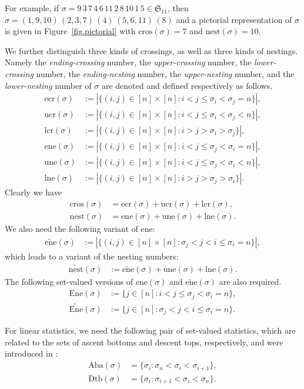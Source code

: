 \documentclass[12pt,reqno]{amsart}
\numberwithin{equation}{section}
\theoremstyle{plain}
\theoremstyle{definition}
\def\Sym{\mathfrak{S}}
\def\nest{\mathrm{nest}}
\def\cros{\mathrm{cros}}
\def\ucr{\mathrm{ucr}}
\def\ecr{\mathrm{ecr}}
\def\lcr{\mathrm{lcr}}
\def\une{\mathrm{une}}
\def\ene{\mathrm{ene}}
\def\lne{\mathrm{lne}}
\def\wene{\widetilde{\mathrm{ene}}}
\def\wne{\widetilde{\mathrm{nest}}}
\def\Ene{\mathrm{Ene}}
\def\Wene{\widetilde{\mathrm{Ene}}}
\def\Aba{\mathrm{Aba}}
\def\Dtb{\mathrm{Dtb}}
\def\Ene{\mathrm{Ene}}
\begin{document}
For example, if
   $\sigma = 9\,3\,7\,4\,6\,11\,2\,8\,10\,1\,5
           \in \Sym_{11}$, then $\sigma= (1,9,10)\,(2,3,7)\,(4)\,(5,6,11)\,(8)$ and a pictorial representation of $\sigma$  is given in Figure~\ref{fig.pictorial} with
           $\cros(\sigma)=7$ and $\nest(\sigma)=10$.

We further distinguish three kinds of crossings, as well as three kinds of nestings. Namely the {\it ending-crossing} number, the {\it upper-crossing} number, the {\it lower-crossing} number, the {\it ending-nesting} number, the {\it upper-nesting} number, and the {\it lower-nesting} number of $\sigma$ are denoted and defined respectively as follows.
\begin{align}
\label{def:ecr}
\ecr(\sigma) &:= |\{(i,j)\in[n]\times[n]:i<j\le\sigma_i<\sigma_j=n\}|,\\
\ucr(\sigma) &:= |\{(i,j)\in[n]\times[n]:i<j\le\sigma_i<\sigma_j<n\}|,\\
\lcr(\sigma) &:= |\{(i,j)\in[n]\times[n]:i>j>\sigma_i>\sigma_j\}|,\\
\ene(\sigma) &:= |\{(i,j)\in[n]\times[n]:i<j\le\sigma_j<\sigma_i=n\}|,\\
\une(\sigma) &:= |\{(i,j)\in[n]\times[n]:i<j\le\sigma_j<\sigma_i<n\}|,\\
\lne(\sigma) &:= |\{(i,j)\in[n]\times[n]:i>j>\sigma_j>\sigma_i\}|.
\end{align}
Clearly we have
\begin{align}\label{eq:crosdecomp}
\cros(\sigma)&=\ecr(\sigma)+\ucr(\sigma)+\lcr(\sigma),\\
\nest(\sigma)&=\ene(\sigma)+\une(\sigma)+\lne(\sigma).
\label{eq:nestdecomp}
\end{align}
We also need the following variant of $\ene$:
\begin{align*}
\wene(\sigma) &:= |\{(i,j)\in[n]\times[n]:\sigma_j<j<i\le\sigma_i=n\}|,
\end{align*}
which leads to a variant of the nesting numbers:
\begin{align}\label{eq:wnedecomp}
\wne(\sigma) &:= \wene(\sigma)+\une(\sigma)+\lne(\sigma).
\end{align}
The following set-valued versions of $\ene(\sigma)$ and $\wene(\sigma)$ are also required.
\begin{align*}
\Ene(\sigma) &:=\{j\in[n]:i<j\le\sigma_j<\sigma_i=n\},\\
\Wene(\sigma) &:=\{j\in[n]:\sigma_j<j<i\le\sigma_i=n\}.
\end{align*}

For linear statistics, we need the following pair of set-valued statistics, which are related to the sets of ascent bottoms and descent tops, respectively, and were introduced in \cite{CF23}:
\begin{align*}
\Aba(\sigma) &=\{\sigma_i : \sigma_n<\sigma_i<\sigma_{i+1}\}, \\[3pt]
\Dtb(\sigma) &=\{\sigma_i : \sigma_{i+1}<\sigma_i <\sigma_n\}.
\end{align*}
\end{document}
